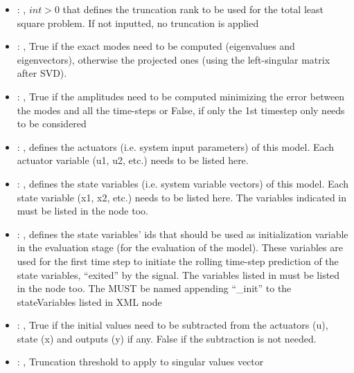 \begin{itemize}
    \item {}: , 
      $int > 0$ that defines the truncation rank to be used for the total
      least square problem. If not inputted, no truncation is applied

    \item {}: , 
      True if the exact modes need to be computed (eigenvalues and
      eigenvectors),   otherwise the projected ones (using the left-singular matrix after SVD).

    \item {}: , 
      True if the amplitudes need to be computed minimizing the error
      between the modes and all the time-steps or False, if only the 1st timestep only needs to be
      considered

    \item {}: , 
      defines the actuators (i.e. system input parameters)
      of this model. Each actuator variable (u1, u2, etc.) needs to
      be listed here.

    \item {}: , 
      defines the state variables (i.e. system variable vectors)
      of this model. Each state variable (x1, x2, etc.) needs to be listed
      here. The variables indicated in  must be
      listed in the  node too.

    \item {}: , 
      defines the state variables' ids  that should be used as
      initialization variable                                                   in the evaluation
      stage (for the evaluation of the model).
      These variables are used for the first time step to initiate
      the rolling time-step prediction of the state variables, ``exited''
      by the  signal. The variables listed in
       must be listed in the  
      node too.                                                   \nb The
       MUST be named appending ``\_init'' to
      the stateVariables listed in  XML node

    \item {}: , 
      True if the initial values need to be subtracted from the
      actuators (u), state (x) and outputs (y) if any. False if the subtraction
      is not needed.

    \item {}: , 
      Truncation threshold to apply to singular values vector
  \end{itemize}

